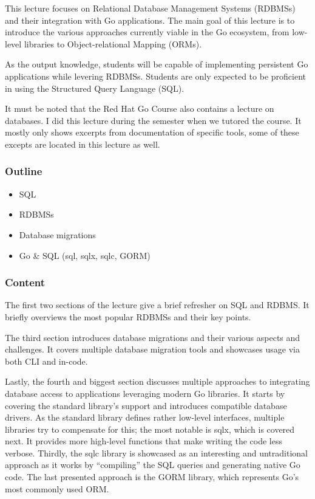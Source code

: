 \documentclass[
  digital,
  color,
  oneside,
  nosansbold,
  nocolorbold,
  nolof,
  nolot,
]{fithesis4}
\begin{document}
This lecture focuses on Relational Database Management Systems (RDBMSs) and their integration with Go applications. The main goal of this lecture is to introduce the various approaches currently viable in the Go ecosystem, from low-level libraries to Object-relational Mapping (ORMs).

As the output knowledge, students will be capable of implementing persistent Go applications while levering RDBMSs. Students are only expected to be proficient in using the Structured Query Language (SQL).

It must be noted that the Red Hat Go Course also contains a lecture on databases. I did this lecture during the semester when we tutored the course. It mostly only shows excerpts from documentation of specific tools, some of these excepts are located in this lecture as well.

\subsubsection{Outline}

\begin{itemize}
    \item SQL
    \item RDBMSs
    \item Database migrations
    \item Go \& SQL (sql, sqlx, sqlc, GORM)
\end{itemize}

\subsubsection{Content}

The first two sections of the lecture give a brief refresher on SQL and RDBMS. It briefly overviews the most popular RDBMSs and their key points.

The third section introduces database migrations and their various aspects and challenges. It covers multiple database migration tools and showcases usage via both CLI and in-code.

Lastly, the fourth and biggest section discusses multiple approaches to integrating database access to applications leveraging modern Go libraries. It starts by covering the
standard library's support and introduces compatible database drivers. As the standard library defines rather low-level interfaces, multiple libraries try to compensate for this; the most notable is sqlx\cite{sqlx}, which is covered next. It provides more high-level functions that make writing the code less verbose. Thirdly, the sqlc\cite{sqlc} library is showcased as an interesting and untraditional approach as it works by \enquote{compiling} the SQL queries and generating native Go code. The last presented approach is the GORM\cite{gorm} library, which represents Go's most commonly used ORM.
\end{document}
